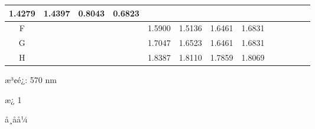 \documentclass[UTF8,10pt,a4paper,fontset=fandol]{ctexart}
\newcommand{\fieldvalue}[1]{#1}
\begin{document}
\begin{center}
\begin{tabular}{c|c|c|c|c|c|c|c|c|c|c|c|c}
\fieldvalue{1.4279}&
\fieldvalue{1.4397}&
\fieldvalue{0.8043}&
\fieldvalue{0.6823}&&&\\ \hline
F&&&&
\fieldvalue{1.5900}&
\fieldvalue{1.5136}&
\fieldvalue{1.6461}&
\fieldvalue{1.6831}&&&\\ \hline
G&&&&
\fieldvalue{1.7047}&
\fieldvalue{1.6523}&
\fieldvalue{1.6461}&
\fieldvalue{1.6831}&&&\\ \hline
H&&&&
\fieldvalue{1.8387}&
\fieldvalue{1.8110}&
\fieldvalue{1.7859}&
\fieldvalue{1.8069}&&&
\end{tabular}
\end{center}

\noindent
æ³¢é¿: 570 nm

\noindent
æ¿ 1

\noindent
å¸åå¼
\end{document}
